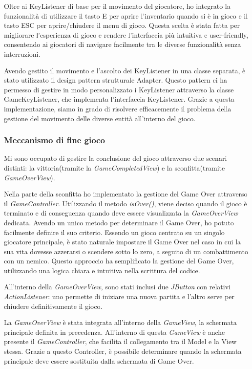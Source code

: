 \documentclass[a4paper,12pt]{report}
\begin{document}
Oltre ai KeyListener di base per il movimento del giocatore, ho integrato la funzionalità di utilizzare il tasto E per aprire l'inventario quando si è in gioco e il tasto ESC per aprire/chiudere il menu di gioco. Questa scelta è stata fatta per migliorare l'esperienza di gioco e rendere l'interfaccia più intuitiva e user-friendly, consentendo ai giocatori di navigare facilmente tra le diverse funzionalità senza interruzioni.

Avendo gestito il movimento e l'ascolto dei KeyListener in una classe separata, è stato utilizzato il design pattern strutturale Adapter. Questo pattern ci ha permesso di gestire in modo personalizzato i KeyListener attraverso la classe GameKeyListener, che implementa l'interfaccia KeyListener. Grazie a questa implementazione, siamo in grado di risolvere efficacemente il problema della gestione del movimento delle diverse entità all'interno del gioco.

\subsubsection{Meccanismo di fine gioco}
Mi sono occupato di gestire la conclusione del gioco attraverso due scenari distinti: la vittoria(tramite la \textit{GameCompletedView}) e la sconfitta(tramite \textit{GameOverView}).

Nella parte della sconfitta ho implementato la gestione del Game Over attraverso il \textit{GameController}. Utilizzando il metodo \textit{isOver()}, viene deciso quando il gioco è terminato e di conseguenza quando deve essere visualizzata la \textit{GameOverView} dedicata. Avendo un unico metodo per determinare il Game Over, ho potuto facilmente definire il suo criterio. Essendo un gioco centrato su un singolo giocatore principale, è stato naturale impostare il Game Over nel caso in cui la sua vita dovesse azzerarsi o scendere sotto lo zero, a seguito di un combattimento con un nemico. Questo approccio ha semplificato la gestione del Game Over, utilizzando una logica chiara e intuitiva nella scrittura del codice.

All'interno della \textit{GameOverView}, sono stati inclusi due \textit{JButton} con relativi \textit{ActionListener}: uno permette di iniziare una nuova partita e l'altro serve per chiudere definitivamente il gioco.

La \textit{GameOverView} è stata integrata all'interno della \textit{GameView}, la schermata principale definita in precedenza. All'interno di questa \textit{GameView} è anche presente il \textit{GameController}, che facilita il collegamento tra il Model e la View stessa. Grazie a questo Controller, è possibile determinare quando la schermata principale deve essere sostituita dalla schermata di Game Over.
\end{document}
